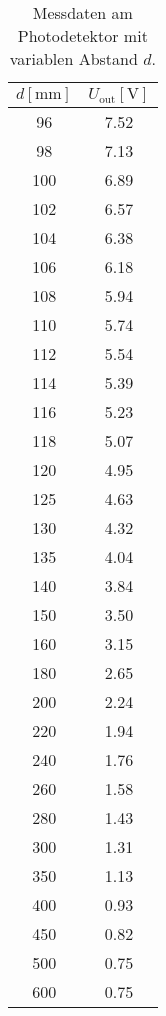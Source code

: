 \begin{table}
    \centering
    \caption{Messdaten am Photodetektor mit variablen Abstand $d$.}
    \label{tab:3}
    \begin{tabular}{c c}
        \toprule
        $d [\si{\milli\meter}]$ & $U_{\text{out}} [\si{\volt}]$ \\
        \midrule
        96      &   7.52  \\
         98      &   7.13 \\   
        100     &    6.89 \\ 
        102     &    6.57 \\ 
        104     &    6.38 \\ 
        106     &    6.18 \\ 
        108     &    5.94 \\ 
        110     &    5.74 \\ 
        112     &    5.54 \\ 
        114     &    5.39 \\ 
        116     &    5.23 \\ 
        118     &    5.07 \\ 
        120     &    4.95 \\ 
        125     &    4.63 \\ 
        130     &    4.32 \\ 
        135     &    4.04 \\ 
        140     &    3.84 \\ 
        150     &    3.50 \\ 
        160     &    3.15 \\ 
        180     &    2.65 \\ 
        200     &    2.24 \\ 
        220     &    1.94 \\ 
        240     &    1.76 \\ 
        260     &    1.58 \\ 
        280     &    1.43 \\ 
        300     &    1.31 \\ 
        350     &    1.13 \\ 
        400     &    0.93 \\ 
        450     &    0.82 \\ 
        500     &    0.75 \\ 
        600     &    0.75 \\            
        \end{tabular}
\end{table}